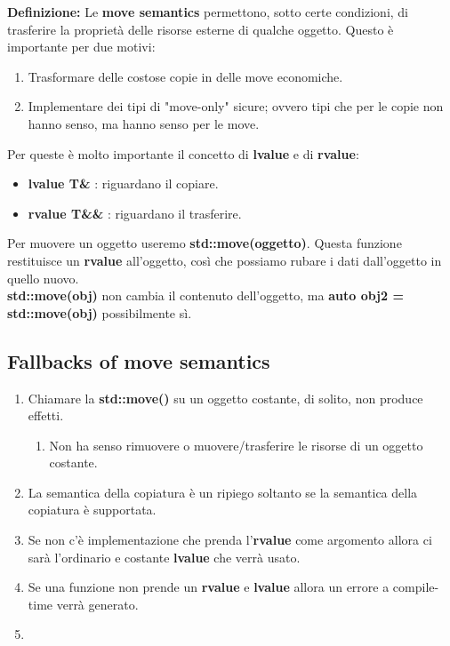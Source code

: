 \textsf{\small \textbf{Definizione: } Le \textbf{move semantics} permettono, sotto certe condizioni, di trasferire la proprietà delle risorse esterne di qualche oggetto. Questo è importante per due motivi: } \\

\begin{enumerate}
	\item \textsf{\small Trasformare delle costose copie in delle move economiche.}
	\item \textsf{\small Implementare dei tipi di "move-only" sicure; ovvero tipi che per le copie non hanno senso, ma hanno senso per le move.}
\end{enumerate}

\textsf{\small Per queste è molto importante il concetto di \textbf{lvalue} e di \textbf{rvalue}: } \\

\begin{itemize}
	\item \textsf{\small \textbf{lvalue T\&} : riguardano il copiare.}
	\item \textsf{\small \textbf{rvalue T\&\&} : riguardano il trasferire.}
\end{itemize}

\textsf{\small Per muovere un oggetto useremo \textbf{std::move(oggetto)}. Questa funzione restituisce un \textbf{rvalue} all'oggetto, così che possiamo rubare i dati dall'oggetto in quello nuovo.} \\

\textsf{\small \textbf{std::move(obj)} non cambia il contenuto dell'oggetto, ma \textbf{auto obj2 = std::move(obj)} possibilmente sì.} \\

\subsection{Fallbacks of move semantics}

\begin{enumerate}
	\item \textsf{\small Chiamare la \textbf{std::move()} su un oggetto costante, di solito, non produce effetti.}
	\begin{enumerate}
		\item \textsf{\small Non ha senso rimuovere o muovere/trasferire le risorse di un oggetto costante.}
	\end{enumerate}
	\item \textsf{\small La semantica della copiatura è un ripiego soltanto se la semantica della copiatura è supportata.}
	\item \textsf{\small Se non c'è implementazione che prenda l'\textbf{rvalue} come argomento allora ci sarà l'ordinario e costante \textbf{lvalue} che verrà usato.}
	\item \textsf{\small Se una funzione non prende un \textbf{rvalue} e \textbf{lvalue} allora un errore a compile-time verrà generato.}
	\item \textsf{\small }
\end{enumerate}

